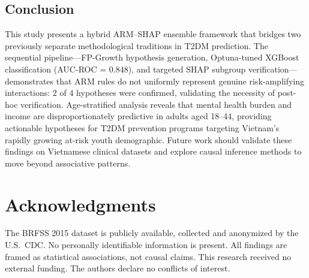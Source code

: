 ﻿\documentclass[12pt,a4paper]{article}
\begin{document}
\subsection{Conclusion}

This study presents a hybrid ARM--SHAP ensemble framework that bridges two previously
separate methodological traditions in T2DM prediction. The sequential pipeline---FP-Growth
hypothesis generation, Optuna-tuned XGBoost classification (AUC-ROC = 0.848), and targeted
SHAP subgroup verification---demonstrates that ARM rules do not uniformly represent genuine
risk-amplifying interactions: 2 of 4 hypotheses were confirmed, validating the necessity
of post-hoc verification. Age-stratified analysis reveals that mental health burden and
income are disproportionately predictive in adults aged 18--44, providing actionable
hypotheses for T2DM prevention programs targeting Vietnam's rapidly growing at-risk youth
demographic. Future work should validate these findings on Vietnamese clinical datasets
and explore causal inference methods to move beyond associative patterns.

\section*{Acknowledgments}
The BRFSS 2015 dataset is publicly available, collected and anonymized by the U.S.\ CDC.
No personally identifiable information is present. All findings are framed as statistical
associations, not causal claims. This research received no external funding. The authors
declare no conflicts of interest.
\end{document}
